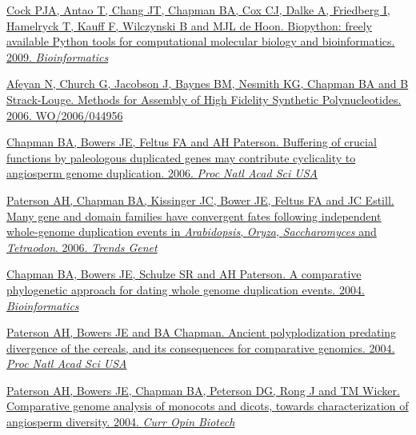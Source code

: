\documentclass[10pt]{article}
\makeatletter
\newlength{\bibhang}
\newlength{\bibsep}
 {\@listi \global\bibsep\itemsep \global\advance\bibsep by\parsep}
\newenvironment{bibsection}%
        {\vspace{-\baselineskip}\begin{list}{}{%
       \setlength{\leftmargin}{\bibhang}%
       \setlength{\itemindent}{-\leftmargin}%
       \setlength{\itemsep}{\bibsep}%
       \setlength{\parsep}{\z@}%
        \setlength{\partopsep}{0pt}%
        \setlength{\topsep}{0pt}}}
        {\end{list}\vspace{-.6\baselineskip}}
\makeatother
\begin{document}
\begin{bibsection}
  \item \href{http://bioinformatics.oxfordjournals.org/content/25/11/1422.long}
    {Cock PJA, Antao T, Chang JT, Chapman BA, Cox CJ, Dalke A, Friedberg I,
    Hamelryck T, Kauff F, Wilczynski B and MJL de Hoon.
    Biopython: freely available Python tools for
     computational molecular biology and bioinformatics. 2009.
     \textit{Bioinformatics}}

  \item \href{http://www.google.com/patents/about?id=j2yYAAAAEBAJ}
    {Afeyan N, Church G, Jacobson J, Baynes BM, Nesmith KG, Chapman BA 
    and B Strack-Louge.
    Methods for Assembly of High Fidelity Synthetic
     Polynucleotides. 2006. WO/2006/044956}

   \item \href{http://www.pnas.org/content/103/8/2730.long}
     {Chapman BA, Bowers JE, Feltus FA and AH Paterson.
     Buffering of crucial functions by paleologous
     duplicated genes may contribute cyclicality to angiosperm genome
     duplication. 2006. \textit{Proc Natl Acad Sci USA}}

  \item \href{http://linkinghub.elsevier.com/retrieve/pii/S0168-9525(06)00296-4}
    {Paterson AH, Chapman BA, Kissinger JC, Bower JE, Feltus FA and JC Estill.
    Many gene and domain families have convergent fates
    following independent whole-genome duplication events in
    \textit{Arabidopsis}, \textit{Oryza}, \textit{Saccharomyces} and
    \textit{Tetraodon}. 2006. \textit{Trends Genet}}

  \item \href{http://bioinformatics.oxfordjournals.org/content/20/2/180.abstract}
    {Chapman BA, Bowers JE, Schulze SR and AH Paterson.
    A comparative phylogenetic approach for dating whole genome
    duplication events. 2004. \textit{Bioinformatics}}

  \item \href{http://www.pnas.org/content/101/26/9903.long}
    {Paterson AH, Bowers JE and BA Chapman.
    Ancient polyplodization predating divergence of the
    cereals, and its consequences for comparative genomics. 2004.
    \textit{Proc Natl Acad Sci USA}}

  \item \href{http://linkinghub.elsevier.com/retrieve/pii/S0958166904000308}
    {Paterson AH, Bowers JE, Chapman BA, Peterson DG, Rong J and TM Wicker. 
    Comparative genome analysis of monocots and dicots, towards characterization 
    of angiosperm diversity. 2004. \textit{Curr Opin Biotech}}


\end{bibsection}
\end{document}
